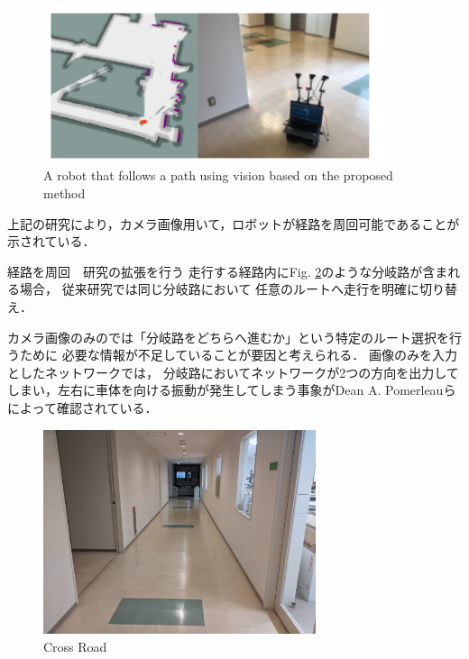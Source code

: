 \begin{figure}[h]
    \centering
    \includegraphics[width = 10cm]{./figs/okada.png}
    \caption{A robot that follows a path using vision based on the proposed method\cite{okada}}
    \label{fig::okada}
\end{figure}


上記の研究により，カメラ画像用いて，ロボットが経路を周回可能であることが示されている．


経路を周回　研究の拡張を行う
走行する経路内にFig. \ref{fig::bunki}のような分岐路が含まれる場合，
従来研究では同じ分岐路において
任意のルートへ走行を明確に切り替え．

カメラ画像のみのでは「分岐路をどちらへ進むか」という特定のルート選択を行うために
必要な情報が不足していることが要因と考えられる．
画像のみを入力としたネットワークでは，
分岐路においてネットワークが2つの方向を出力してしまい，左右に車体を向ける振動が発生してしまう事象がDean A. Pomerleauら\cite{pomeru}によって確認されている．

\begin{figure}[h]
    \centering
    \includegraphics[width = 8cm]{./figs/bunki.jpg}
    \caption{Cross Road}
    \label{fig::bunki}
\end{figure}
\newpage

